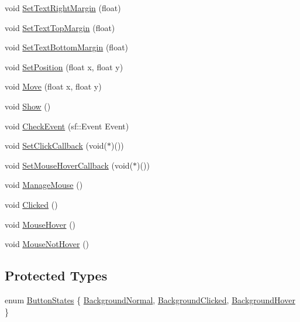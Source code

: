 \begin{CompactItemize}
void \hyperlink{classsfgui_1_1Object_dcea61673771a680fc47e4b838c2a59e}{SetTextRightMargin} (float)
\item 
void \hyperlink{classsfgui_1_1Object_6c3eb411a957d05707d858ded4cd951c}{SetTextTopMargin} (float)
\item 
void \hyperlink{classsfgui_1_1Object_db61eb19249fbbd28462cc79ca17b738}{SetTextBottomMargin} (float)
\item 
void \hyperlink{classsfgui_1_1Object_664c57bd35504a7d00963980d68dd022}{SetPosition} (float x, float y)
\item 
void \hyperlink{classsfgui_1_1Object_70b15fba99da515808d3da7d8042f458}{Move} (float x, float y)
\item 
void \hyperlink{classsfgui_1_1Object_cdf7f9b5f731e49e0e13e55de704805d}{Show} ()
\item 
void \hyperlink{classsfgui_1_1Object_cd9dbf2abe79e04c22f281bccb8bdb0e}{CheckEvent} (sf::Event Event)
\item 
void \hyperlink{classsfgui_1_1Object_d3d20a4cccde599748db724236ca0826}{SetClickCallback} (void($\ast$)())
\item 
void \hyperlink{classsfgui_1_1Object_8317dbdf44797dd69de490d4b946ed83}{SetMouseHoverCallback} (void($\ast$)())
\item 
void \hyperlink{classsfgui_1_1Object_3332575d988f9eee589f57b2ad516593}{ManageMouse} ()
\item 
void \hyperlink{classsfgui_1_1Object_da7f84701d318ce93fe59cc2f571eaf2}{Clicked} ()
\item 
void \hyperlink{classsfgui_1_1Object_68d1941ad05b3d0bdf2ba85702c04cc0}{MouseHover} ()
\item 
void \hyperlink{classsfgui_1_1Object_24575661efb4ab88be76eb2e1a4947e6}{MouseNotHover} ()
\end{CompactItemize}
\subsection*{Protected Types}
\begin{CompactItemize}
\item 
enum \hyperlink{classsfgui_1_1Object_8a7d7ae20a88b7ef8a104f7e6c8596ce}{ButtonStates} \{ \hyperlink{classsfgui_1_1Object_8a7d7ae20a88b7ef8a104f7e6c8596cee8211d79a1f35d08db2b31a914bddc38}{BackgroundNormal}, 
\hyperlink{classsfgui_1_1Object_8a7d7ae20a88b7ef8a104f7e6c8596ce03b529b6f0fee7ab7cc0033441180b67}{BackgroundClicked}, 
\hyperlink{classsfgui_1_1Object_8a7d7ae20a88b7ef8a104f7e6c8596ce9befc9dbae9107e3e7546af33a139df9}{BackgroundHover}
 \}
\end{CompactItemize}
